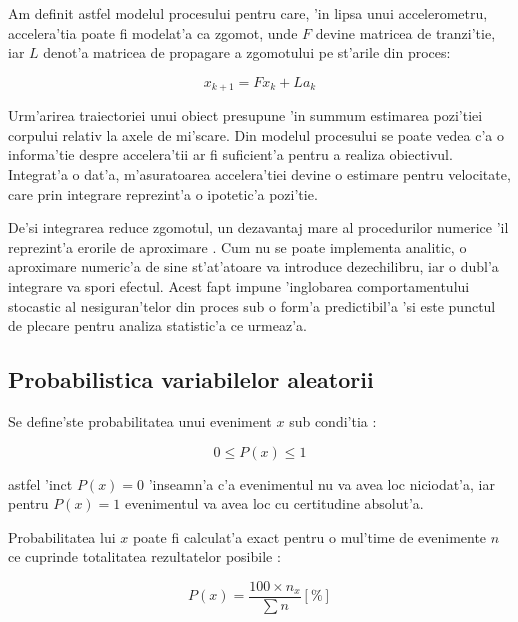 \documentclass[12pt,a4paper,twoside]{report}
\begin{document}
Am definit astfel modelul procesului pentru care, 'in lipsa unui accelerometru, accelera'tia poate fi modelat'a ca zgomot, unde $F$ devine matricea de tranzi'tie, iar $L$ denot'a matricea de propagare a zgomotului pe st'arile din proces:


\begin{equation}
    x_{k+1} = F x_k + L a_k
\end{equation}


Urm'arirea traiectoriei unui obiect presupune 'in summum estimarea pozi'tiei corpului relativ la axele de mi'scare. Din modelul procesului se poate vedea c'a o informa'tie despre accelera'tii ar fi suficient'a pentru a realiza obiectivul. Integrat'a o dat'a, m'asuratoarea accelera'tiei devine o estimare pentru velocitate, care prin integrare reprezint'a o ipotetic'a pozi'tie.

\vspace{5px}

De'si integrarea reduce zgomotul, un dezavantaj mare al procedurilor numerice 'il reprezint'a erorile de aproximare \cite{RK4}. Cum nu se poate implementa analitic, o aproximare numeric'a de sine st'at'atoare va introduce dezechilibru, iar o dubl'a integrare va spori efectul.  Acest fapt impune 'inglobarea comportamentului stocastic al nesiguran'telor din proces sub o form'a predictibil'a 'si este punctul de plecare pentru analiza statistic'a ce urmeaz'a.

\subsection{Probabilistica variabilelor aleatorii}

Se define'ste probabilitatea unui eveniment $x$ sub condi'tia \cite{probability} :

\begin{equation}
    0 \leq P(x) \leq 1
\end{equation}

astfel 'inc\ia t $P(x) = 0$ 'inseamn'a c'a evenimentul nu va avea loc niciodat'a, iar pentru $P(x) = 1$ evenimentul va avea loc cu certitudine absolut'a. 

\vspace{5px}

Probabilitatea lui $x$ poate fi calculat'a exact pentru o mul'time de evenimente $n$ ce cuprinde totalitatea rezultatelor posibile \cite{probability}:

\begin{equation}
    P(x) = \frac{100 \times n_x}{\sum n} [\%] 
\end{equation}
\end{document}
